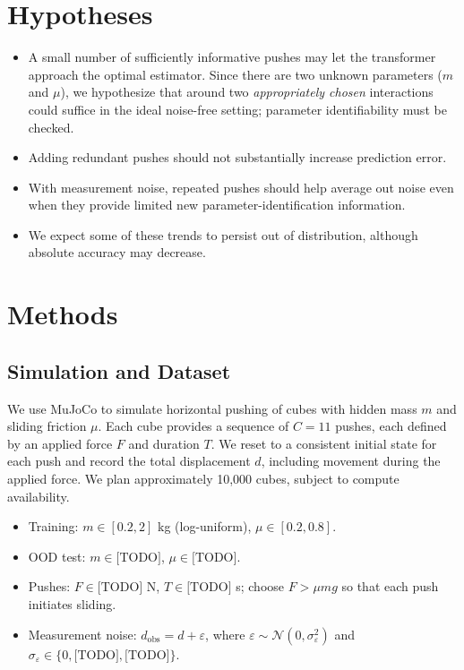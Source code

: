 \documentclass[12pt]{article}
\begin{document}
\section{Hypotheses}
\begin{itemize}
    \item A small number of sufficiently informative pushes may let the transformer approach the optimal estimator. Since there are two unknown parameters ($m$ and $\mu$), we hypothesize that around two \emph{appropriately chosen} interactions could suffice in the ideal noise-free setting; parameter identifiability must be checked.
    \item Adding redundant pushes should not substantially increase prediction error.
    \item With measurement noise, repeated pushes should help average out noise even when they provide limited new parameter-identification information.
    \item We expect some of these trends to persist out of distribution, although absolute accuracy may decrease.
\end{itemize}

\section{Methods}
\subsection{Simulation and Dataset}
We use MuJoCo to simulate horizontal pushing of cubes with hidden mass $m$ and sliding friction $\mu$. Each cube provides a sequence of $C=11$ pushes, each defined by an applied force $F$ and duration $T$. We reset to a consistent initial state for each push and record the total displacement $d$, including movement during the applied force. We plan approximately 10,000 cubes, subject to compute availability.

\begin{itemize}
    \item Training: $m\in[0.2,2]$ kg (log-uniform), $\mu\in[0.2,0.8]$.
    \item OOD test: $m\in\text{[TODO]}$, $\mu\in\text{[TODO]}$.
    \item Pushes: $F\in\text{[TODO]}$ N, $T\in\text{[TODO]}$ s; choose $F>\mu m g$ so that each push initiates sliding.
    \item Measurement noise: $d_{\mathrm{obs}}=d+\varepsilon$, where $\varepsilon\sim\mathcal N(0,\sigma_\varepsilon^2)$ and $\sigma_\varepsilon\in\{0,\text{[TODO]},\text{[TODO]}\}$.
\end{itemize}
\end{document}
